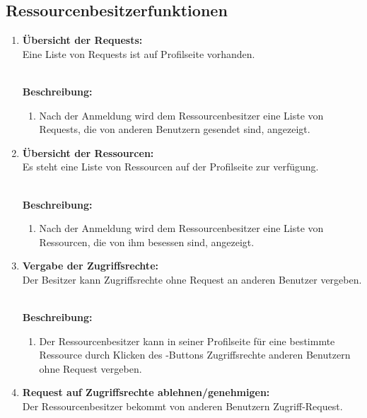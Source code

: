 \documentclass[parskip=full,11pt]{scrartcl}
\def\threedigits#1{%
  \ifnum#1<10 0\fi
  \ifnum#1<1 0\fi
  \number#1}
\begin{document}
\subsection{Ressourcenbesitzerfunktionen}
\begin{enumerate}[label={\textbf{/F\protect\threedigits{\theenumi}0/}}, leftmargin=*, resume]
\item \label{FARB1} \textbf{Übersicht der Requests:}\\
Eine Liste von Requests ist auf Profilseite vorhanden.\\\

\textbf{Beschreibung:}\\
\begin{enumerate}[label=(\arabic*), leftmargin=*]
\item Nach der Anmeldung wird dem Ressourcenbesitzer eine Liste von Requests, die von anderen Benutzern gesendet sind, angezeigt.  
\end{enumerate}
\item \label{FARB2} \textbf{Übersicht der Ressourcen:}\\
Es steht eine Liste von Ressourcen auf der Profilseite zur verfügung.\\\

\textbf{Beschreibung:}\\
\begin{enumerate}[label=(\arabic*), leftmargin=*]

\item Nach der Anmeldung wird dem Ressourcenbesitzer eine Liste von Ressourcen, die von ihm besessen sind, angezeigt.  
\end{enumerate}


\item \label{FARB3} \textbf {Vergabe der Zugriffsrechte:}\\ 
Der Besitzer kann Zugriffsrechte ohne Request an anderen Benutzer vergeben.\\\

\textbf{Beschreibung:}\\
\begin{enumerate}[label=(\arabic*), leftmargin=*]

\item Der Ressourcenbesitzer kann in seiner Profilseite für eine bestimmte Ressource durch Klicken des \grqq -Buttons Zugriffsrechte anderen Benutzern ohne Request vergeben.
\end{enumerate}
\item \label{FARB4} \textbf {Request auf Zugriffsrechte ablehnen/genehmigen:}\\ 
Der Ressourcenbesitzer bekommt von anderen Benutzern Zugriff-Request. \\\\



\end{enumerate}
\end{document}

